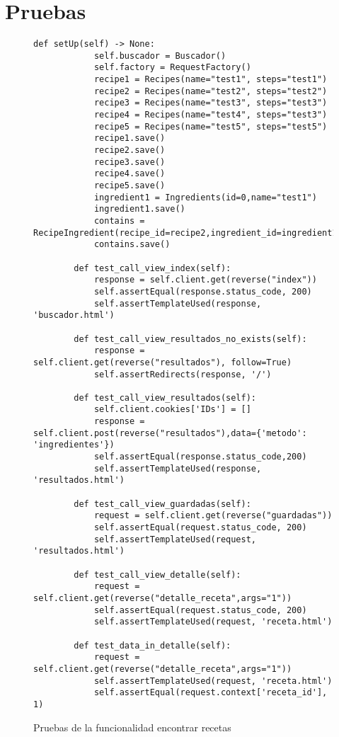 \chapter{Pruebas}
\begin{figure}[H]
    \begin{lstlisting}[style=consola]
        def setUp(self) -> None:
            self.buscador = Buscador()
            self.factory = RequestFactory()
            recipe1 = Recipes(name="test1", steps="test1")
            recipe2 = Recipes(name="test2", steps="test2")
            recipe3 = Recipes(name="test3", steps="test3")
            recipe4 = Recipes(name="test4", steps="test3")
            recipe5 = Recipes(name="test5", steps="test5")
            recipe1.save()
            recipe2.save()
            recipe3.save()
            recipe4.save()
            recipe5.save()
            ingredient1 = Ingredients(id=0,name="test1")
            ingredient1.save()
            contains = RecipeIngredient(recipe_id=recipe2,ingredient_id=ingredient1)
            contains.save()
    
        def test_call_view_index(self):
            response = self.client.get(reverse("index"))
            self.assertEqual(response.status_code, 200)
            self.assertTemplateUsed(response, 'buscador.html')
        
        def test_call_view_resultados_no_exists(self):
            response = self.client.get(reverse("resultados"), follow=True)
            self.assertRedirects(response, '/')
    
        def test_call_view_resultados(self):
            self.client.cookies['IDs'] = []
            response = self.client.post(reverse("resultados"),data={'metodo': 'ingredientes'})
            self.assertEqual(response.status_code,200)
            self.assertTemplateUsed(response, 'resultados.html')
    
        def test_call_view_guardadas(self):
            request = self.client.get(reverse("guardadas"))
            self.assertEqual(request.status_code, 200)
            self.assertTemplateUsed(request, 'resultados.html')
    
        def test_call_view_detalle(self):
            request = self.client.get(reverse("detalle_receta",args="1"))
            self.assertEqual(request.status_code, 200)
            self.assertTemplateUsed(request, 'receta.html')
    
        def test_data_in_detalle(self):
            request = self.client.get(reverse("detalle_receta",args="1"))
            self.assertTemplateUsed(request, 'receta.html')
            self.assertEqual(request.context['receta_id'], 1)
\end{lstlisting}
    \caption{Pruebas de la funcionalidad encontrar recetas}
    \label{sni:test}
\end{figure}